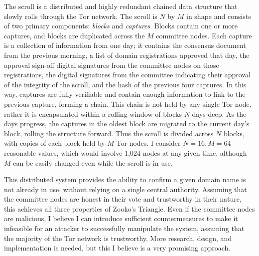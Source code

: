 The scroll is a distributed and highly redundant chained data structure that slowly rolls through the Tor network. The scroll is $ N $ by $ M $ in shape and consists of two primary components: \textit{blocks} and \textit{captures}. Blocks contain one or more captures, and blocks are duplicated across the $ M $ committee nodes. Each capture is a collection of information from one day; it contains the consensus document from the previous morning, a list of domain registrations approved that day, the approval sign-off digital signatures from the committee nodes on those registrations, the digital signatures from the committee indicating their approval of the integrity of the scroll, and the hash of the previous four captures. In this way, captures are fully verifiable and contain enough information to link to the previous capture, forming a chain. This chain is not held by any single Tor node, rather it is encapsulated within a rolling window of blocks $ N $ days deep. As the days progress, the captures in the oldest block are migrated to the current day's block, rolling the structure forward. Thus the scroll is divided across $ N $ blocks, with copies of each block held by $ M $ Tor nodes. I consider $ N = 16, M = 64 $ reasonable values, which would involve 1,024 nodes at any given time, although $ M $ can be easily changed even while the scroll is in use.

This distributed system provides the ability to confirm a given domain name is not already in use, without relying on a single central authority. Assuming that the committee nodes are honest in their vote and trustworthy in their nature, this achieves all three properties of Zooko's Triangle. Even if the committee nodes are malicious, I believe I can introduce sufficient countermeasures to make it infeasible for an attacker to successfully manipulate the system, assuming that the majority of the Tor network is trustworthy. More research, design, and implementation is needed, but this I believe is a very promising approach.



